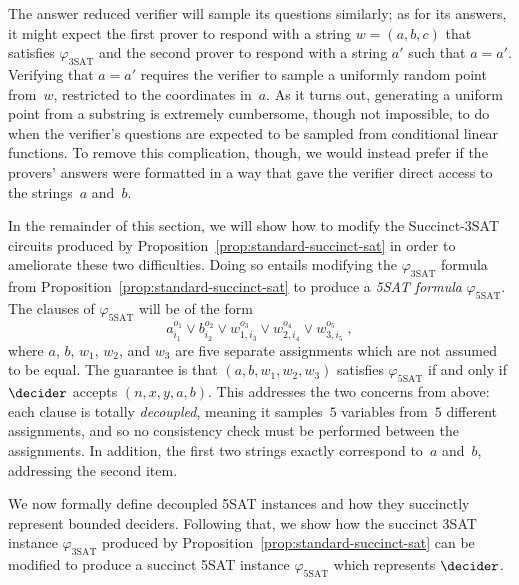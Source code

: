 \begin{enumerate}
	The answer reduced verifier will sample its questions similarly; as for its
  answers, it might expect the first prover to respond with a string $w = (a, b,
  c)$ that satisfies $\varphi_{\mathrm{3SAT}}$ and the second prover to respond
  with a string $a'$ such that $a = a'$.
	Verifying that $a = a'$ requires the verifier to sample a uniformly random
  point from~$w$, restricted to the coordinates in~$a$.
	As it turns out, generating a uniform point from a substring is extremely
  cumbersome, though not impossible, to do when the verifier's questions are
  expected to be sampled from conditional linear functions.
	To remove this complication, though, we would instead prefer if the provers'
  answers were formatted in a way that gave the verifier direct access to the
  strings~$a$ and~$b$.
\end{enumerate}
  
In the remainder of this section, we will show how to modify the Succinct-3SAT
circuits produced by Proposition~\ref{prop:standard-succinct-sat} in order to
ameliorate these two difficulties.
Doing so entails modifying the $\varphi_{\mathrm{3SAT}}$ formula from
Proposition~\ref{prop:standard-succinct-sat} to produce a \emph{5SAT formula}
$\varphi_{\mathrm{5SAT}}$.
The clauses of $\varphi_{\mathrm{5SAT}}$ will be of the form
\begin{equation*}
  a_{i_1}^{o_1} \lor b_{i_2}^{o_2} \lor w_{1, i_3}^{o_3}
  \lor w_{2, i_4}^{o_4} \lor w_{3, i_5}^{o_5}\;,
\end{equation*}
where $a$, $b$, $w_1$, $w_2$, and $w_3$ are five separate assignments which are
not assumed to be equal.
The guarantee is that $(a, b, w_1, w_2, w_3)$ satisfies
$\varphi_{\mathrm{5SAT}}$ if and only if $\decider$ accepts $(n, x, y, a, b)$.
This addresses the two concerns from above: each clause is totally
\emph{decoupled}, meaning it samples~$5$ variables from~$5$ different
assignments, and so no consistency check must be performed between the
assignments.
In addition, the first two strings exactly correspond to~$a$ and~$b$, addressing
the second item.

We now formally define decoupled 5SAT instances and how they succinctly
represent bounded deciders.
Following that, we show how the succinct 3SAT instance $\varphi_{\mathrm{3SAT}}$
produced by Proposition~\ref{prop:standard-succinct-sat} can be modified to
produce a succinct 5SAT instance $\varphi_{\mathrm{5SAT}}$ which represents
$\decider$.

